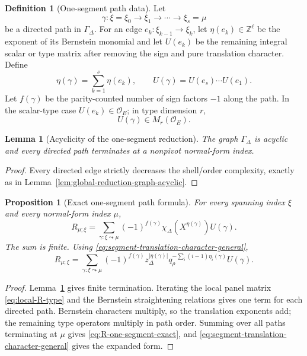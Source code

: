 \documentclass[12pt]{article}
\newtheorem{proposition}[theorem]{Proposition}
\newtheorem{lemma}[theorem]{Lemma}
\theoremstyle{definition}
\newtheorem{definition}[theorem]{Definition}
\theoremstyle{remark}
\newcommand{\Ocoeff}{\mathcal O_E}
\begin{document}
\begin{definition}[One-segment path data]
\label{def:one-segment-path-data}
Let
\[
 \gamma:
 \xi=\xi_0\longrightarrow\xi_1\longrightarrow\cdots
 \longrightarrow\xi_s=\mu
\]
be a directed path in \(\Gamma_\Delta\).  For an edge
\(e_k:\xi_{k-1}\to\xi_k\), let
\(\eta(e_k)\in\mathbb Z^\ell\) be the exponent of its Bernstein monomial and
let \(U(e_k)\) be the remaining integral scalar or type matrix after removing
the sign and pure translation character.  Define
\[
 \eta(\gamma)=\sum_{k=1}^s\eta(e_k),
 \qquad
 U(\gamma)=U(e_s)\cdots U(e_1).
\]
Let \(f(\gamma)\) be the parity-counted number of sign factors \(-1\) along
the path.  In the scalar-type case \(U(e_k)\in\Ocoeff\); in type dimension
\(r\),
\[
 U(\gamma)\in M_r(\Ocoeff).
\]
\end{definition}

\begin{lemma}[Acyclicity of the one-segment reduction]
\label{lem:one-segment-reduction-acyclic}
The graph \(\Gamma_\Delta\) is acyclic and every directed path terminates at
a nonpivot normal-form index.
\end{lemma}

\begin{proof}
Every directed edge strictly decreases the shell/order complexity, exactly
as in Lemma~\ref{lem:global-reduction-graph-acyclic}.
\end{proof}

\begin{proposition}[Exact one-segment path formula]
\label{prop:one-segment-exact-path-formula}
For every spanning index \(\xi\) and every normal-form index \(\mu\),
\begin{equation}\label{eq:R-one-segment-exact}
 \boxed{
 R_{\mu;\xi}
 =
 \sum_{\gamma:\xi\leadsto\mu}
 (-1)^{f(\gamma)}
 \chi_\Delta(X^{\eta(\gamma)})
 U(\gamma).
 }
\end{equation}
The sum is finite.  Using
\eqref{eq:segment-translation-character-general},
\begin{equation}\label{eq:R-one-segment-expanded}
 R_{\mu;\xi}
 =
 \sum_{\gamma:\xi\leadsto\mu}
 (-1)^{f(\gamma)}
 z_\Delta^{|\eta(\gamma)|}
 q_\rho^{-\sum_i(i-1)\eta_i(\gamma)}
 U(\gamma).
\end{equation}
\end{proposition}

\begin{proof}
Lemma~\ref{lem:one-segment-reduction-acyclic} gives finite termination.
Iterating the local panel matrix \eqref{eq:local-R-type} and the Bernstein
straightening relations gives one term for each directed path.  Bernstein
characters multiply, so the translation exponents add; the remaining type
operators multiply in path order.  Summing over all paths terminating at
\(\mu\) gives \eqref{eq:R-one-segment-exact}, and
\eqref{eq:segment-translation-character-general} gives the expanded form.
\end{proof}
\end{document}
